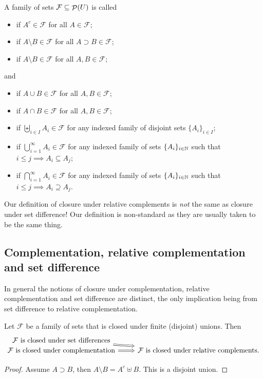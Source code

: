 \begin{definition}
A family of sets $\mathcal{F}\subseteq\mathop{\mathcal{P}}(U)$ is called
\begin{itemize}
\item {} if $A^c\in\mathcal{F}$ for all $A\in\mathcal{F}$;
\item {} if $A\setminus B\in\mathcal{F}$ for all $A \supset B\in\mathcal{F}$;
\item {} if $A\setminus B\in\mathcal{F}$ for all $A, B\in\mathcal{F}$;
\end{itemize}
and
\begin{itemize}
\item {} if $A\cup B \in\mathcal{F}$ for all $A,B\in\mathcal{F}$;
\item {} if $A\cap B \in\mathcal{F}$ for all $A,B\in\mathcal{F}$;
\item {} if $\biguplus_{i\in I}A_i \in\mathcal{F}$ for any indexed family of disjoint sets $\{A_i\}_{i\in I}$;
\item {} if $\bigcup_{i=1}^\infty A_i \in\mathcal{F}$ for any indexed family of sets $\{A_i\}_{i\in \mathbb{N}}$ such that $i\leq j \implies A_i \subseteq A_j$;
\item {} if $\bigcap_{i=1}^\infty A_i \in\mathcal{F}$ for any indexed family of sets $\{A_i\}_{i\in \mathbb{N}}$ such that $i\leq j \implies A_i \supseteq A_j$.
\end{itemize}
Our definition of closure under relative complements is \emph{not} the same as closure under set difference! Our definition is non-standard as they are usually taken to be the same thing.
\end{definition}

\subsection{Complementation, relative complementation and set difference}
In general the notions of closure under complementation, relative complementation and set difference are distinct, the only implication being from set difference to relative complementation.

\begin{lemma} \label{complementTypesUnionClosure}
Let $\mathcal{F}$ be a family of sets that is closed under finite (disjoint) unions. Then
\[ \begin{tikzcd}[row sep=0]
\text{$\mathcal{F}$ is closed under set differences} \arrow[dr, Rightarrow] & \\
\text{$\mathcal{F}$ is closed under complementation} \arrow[r,Rightarrow] & \text{$\mathcal{F}$ is closed under relative complements.}
\end{tikzcd} \]
\end{lemma}
\begin{proof}
Assume $A\supset B$, then $A\setminus B = A^c \uplus B$. This is a disjoint union.
\end{proof}

